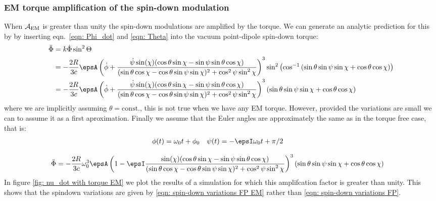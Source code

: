 \documentclass[/home/greg/Thesis/main/main.tex]{subfiles}
\begin{document}
\subsubsection{EM torque amplification of the spin-down modulation}
When $\mathcal{A}_{\mathrm{EM}}$ is greater than unity the spin-down modulations are amplified by 
the torque. We can generate an analytic prediction for this by by inserting
eqn.~\eqref{eqn: Phi_dot} and \eqref{eqn: Theta} into the vacuum point-dipole spin-down
torque:
\begin{align}
    \ddot{\Phi} & = k \dot{\Phi}\sin^{2}\Theta \\
                &=-\frac{2R}{3c} \epsA 
    \left(\dot{\phi} +  \frac{\dot{\psi} \sin(\chi)(\cos\theta\sin\chi - \sin \psi \sin \theta \cos\chi)
    }{(\sin\theta \cos \chi - \cos \theta \sin \psi \sin \chi)^{2} + \cos^{2}\psi \sin^{2} \chi}\right)^{3}
    \sin^{2}\left(\cos^{-1}\left(\sin\theta\sin\psi\sin\chi + \cos\theta\cos\chi\right)\right)\\
    &=-\frac{2R}{3c} \epsA 
    \left(\dot{\phi} +  \frac{\dot{\psi} \sin(\chi)(\cos\theta\sin\chi - \sin \psi \sin \theta \cos\chi)
    }{(\sin\theta \cos \chi - \cos \theta \sin \psi \sin \chi)^{2} + \cos^{2}\psi \sin^{2} \chi}\right)^{3}
    \left(\sin\theta\sin\psi\sin\chi + \cos\theta\cos\chi\right)
\end{align}
where we are implicitly assuming $\theta=\mathrm{const.}$, this is not true 
when we have any EM torque. However, provided the variations are small we can
to assume it as a first aproximation.
Finally we assume that the Euler angles are approximately the same as in 
the torque free case, that is:
\begin{align}
    \phi(t) = \omega_{0}t + \phi_{0} &&& \psi(t) = -\epsI \omega_{0} t + \pi/2
\end{align}

 \begin{align}
     \ddot{\Phi} &=-\frac{2R}{3c} \omega_{0}^{3}\epsA
     \left(1 -  \epsI\frac{ \sin(\chi)(\cos\theta\sin\chi - \sin \psi \sin \theta \cos\chi)
     }{(\sin\theta \cos \chi - \cos \theta \sin \psi \sin \chi)^{2} + \cos^{2}\psi \sin^{2} \chi}\right)^{3}
     \left(\sin\theta\sin\psi\sin\chi + \cos\theta\cos\chi\right)
     \label{eqn: Phi_dot EM}
 \end{align}     
In figure \ref{fig: nu_dot with torque EM} we plot the results of a simulation
for which this amplifcation factor is greater than unity. This shows that the
spindown variations are given by \ref{eqn: spin-down variations FP EM} rather
than \eqref{eqn: spin-down variations FP}.
\end{document}
